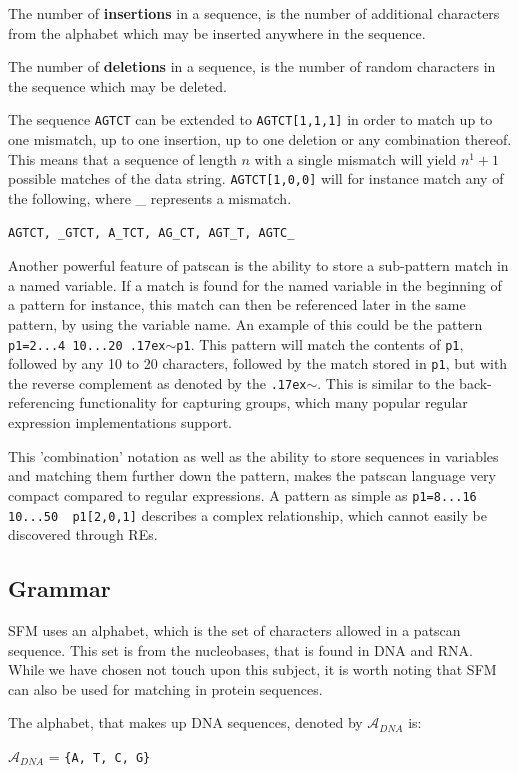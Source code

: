 \documentclass[12pt]{article}
\theoremstyle{definition}
\begin{document}
\begin{definition}
	The number of \textbf{insertions} in a sequence, is the number of additional characters from the alphabet which may be inserted anywhere in the sequence.
\end{definition}

\begin{definition}
	The number of \textbf{deletions} in a sequence, is the number of random characters in the sequence which may be deleted.
\end{definition}

The sequence \texttt{AGTCT} can be extended to \texttt{AGTCT[1,1,1]} in order to match up to one mismatch, up to one insertion, up to one deletion or any combination thereof. This means that a sequence of length $n$ with a single mismatch will yield $n^1+1$ possible matches of the data string. \texttt{AGTCT[1,0,0]} will for instance match any of the following, where \_ represents a mismatch.

\texttt{AGTCT, \_GTCT, A\_TCT, AG\_CT, AGT\_T, AGTC\_}

Another powerful feature of patscan is the ability to store a sub-pattern match in a named variable. If a match is found for the named variable in the beginning of a pattern for instance, this match can then be referenced later in the same pattern, by using the variable name. An example of this could be the pattern \texttt{p1=2...4 10...20 {\raise.17ex\hbox{$\scriptstyle\mathtt{\sim}$}}p1}. This pattern will match the contents of \texttt{p1}, followed by any 10 to 20 characters, followed by the match stored in \texttt{p1}, but with the reverse complement as denoted by the \texttt{{\raise.17ex\hbox{$\scriptstyle\mathtt{\sim}$}}}. This is similar to the back-referencing functionality for capturing groups, which many popular regular expression implementations support.%

This 'combination' notation as well as the ability to store sequences in variables and matching them further down the pattern, makes the patscan language very compact compared to regular expressions. A pattern as simple as \texttt{p1=8...16 10...50 ~p1[2,0,1]} describes a complex relationship, which cannot easily be discovered through REs.

\subsection{Grammar}
\label{Patscan grammar}

SFM uses an alphabet, which is the set of characters allowed in a patscan sequence. This set is from the nucleobases, that is found in DNA and RNA. While we have chosen not touch upon this subject, it is worth noting that SFM can also be used for matching in protein sequences.
\begin{definition}
The alphabet, that makes up DNA sequences, denoted by $\mathcal{A}_{DNA}$ is:
\begin{center}
$\mathcal{A}_{DNA}$ = \texttt{\{A, T, C, G\}}
\end{center}
\end{definition}
\end{document}
